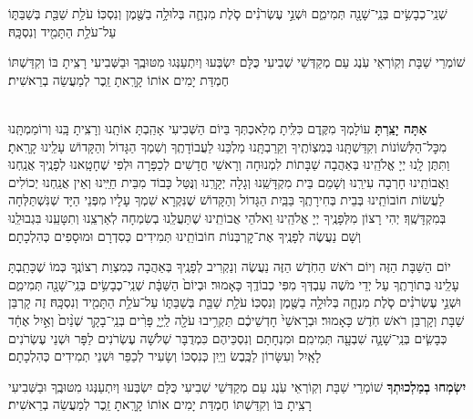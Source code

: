 \documentclass[twoside, openany, parskip=half, 11pt]{book}
\begin{document}
שְׁנֵֽי־כְבָשִׂ֥ים בְּנֵֽי־שָׁנָ֖ה תְּמִימִ֑ם וּשְׁנֵ֣י עֶשְׂרֹנִ֗ים סֹ֧לֶת מִנְחָ֛ה בְּלוּלָ֥ה בַשֶּׁ֖מֶן וְנִסְכּֽוֹ׃ עֹלַ֥ת שַׁבַּ֖ת בְּשַׁבַּתּ֑וֹ עַל־עֹלַ֥ת הַתָּמִ֖יד וְנִסְכָּֽהּ׃

שׁוֹמְרֵי שַׁבָּת וְקֽוֹרְאֵי עֹֽנֶג עַם מְקַדְּשֵׁי שְׁבִיעִי כֻּלָּם יִשְׂבְּעוּ וְיִתְעַנְּגוּ מִטּוּבֶֽךָ וּבַשְּׁבִיעִי רָצִֽיתָ בּוֹ וְקִדַּשְׁתּוֹ חֶמְדַּת יָמִים אוֹתוֹ קָרָֽאתָ זֵֽכֶר לְמַעֲשֵׂה בְרֵאשִׁית׃

\shabboskiddushhayom{} 

\begin{sometimes}

\label{shabbosroshchodesh}
\\
\textbf{אַתָּה יָצַֽרְתָּ}
עוֹלָמְךָ מִקֶּֽדֶם כִּלִּֽיתָ מְלַאכְתְּךָ בַּיוֹם הַשְּׁבִיעִי אָהַֽבְתָּ אוֹתָֽנוּ וְרָצִֽיתָ בָּֽנוּ וְרוֹמַמְתָּֽנוּ מִכׇּל־הַלְּשׁוֹנוֹת וְקִדַּשְׁתָּֽנוּ בְּמִצְוֹתֶֽיךָ וְקֵרַבְתָּֽנוּ מַלְכֵּנוּ לַעֲבוֹדָתֶֽךָ וְשִׁמְךָ הַגָּדוֹל וְהַקָּדוֹשׁ עָלֵֽינוּ קָרָֽאתָ׃ וַתִּתֶּן לָֽנוּ יְיָ אֱלֹהֵֽינוּ בְּאַהֲבָה שַׁבָּתוֹת לִמְנוּחָה וְרָאשֵׁי חֳדָשִׁים לְכַפָּרָה וּלְפִי שֶׁחָטָֽאנוּ לְפָנֶֽיךָ אֲנַֽחְנוּ וַאֲבוֹתֵֽינוּ חָרְבָה עִירֵֽנוּ וְשָׁמֵם בֵּית מִקְדָּשֵֽׁנוּ וְגָלָה יְקָרֵֽנוּ וְנֻּטַּל כָּבוֹד מִבֵּית חַיֵּֽינוּ וְאֵין אֲנַֽחְנוּ יְכוֹלִים לַעֲשׂוֹת חוֹבוֹתֵֽינוּ בְּבֵית בְּחִירָתֶֽךָ בַּבַּֽיִת הַגָּדוֹל וְהַקָּדוֹשׁ שֶׁנִּקְרָא שִׁמְךָ עָלָיו מִפְּנֵי הַיָּד שְׁנִּשְׁתַּלְּחָה בְּמִקְדָּשֶֽׁךָ׃ יְהִי רָצוֹן מִלְּפָנֶֽיךָ יְיָ אֱלֹהֵֽינוּ וֵאלֹהֵי אֲבוֹתֵֽינוּ שֶׁתַּעֲלֵֽנוּ בְשִׂמְחָה לְאַרְצֵֽנוּ וְתִטָּעֵֽנוּ בִּגְבוּלֵֽנוּ וְשָׁם נַעֲשֶׂה לְפָנֶֽיךָ אֶת־קׇרְבְּנוֹת חוֹבוֹתֵֽינוּ תְּמִידִים כְּסִדְרָם וּמוּסָפִים כְּהִלְכָתָם׃

יוֹם הַשַּׁבָּת הַזֶּה וְיוֹם רֹאשׁ הַחֹֽדֶשׁ הַזֶּה נַעֲשֶׂה וְנַקְרִיב לְפָנֶֽיךָ בְּאַהֲבָה כְּמִצְוַת רְצוֹנֶֽךָ כְּמוֹ שֶׁכָּתַֽבְתָּ עָלֵֽינוּ בְּתוֹרָתֶֽךָ עַל יְדֵי מֹשֶׁה עַבְדְּךָ מִפִּי כְבוֹדֶֽךָ כָּאָמוּר׃ וּבְיוֹם֙ הַשַּׁבָּ֔ת שְׁנֵֽי־כְבָשִׂ֥ים בְּנֵֽי־שָׁנָ֖ה תְּמִימִ֑ם וּשְׁנֵ֣י עֶשְׂרֹנִ֗ים סֹ֧לֶת מִנְחָ֛ה בְּלוּלָ֥ה בַשֶּׁ֖מֶן וְנִסְכּֽוֹ׃ עֹלַ֥ת שַׁבַּ֖ת בְּשַׁבַּתּ֑וֹ עַל־עֹלַ֥ת הַתָּמִ֖יד וְנִסְכָּֽהּ׃ זֶה קָרְבַּן שַׁבָּת וְקָרְבַּן רֹאשׁ חֹֽדֶשׁ כָּאָמוּר׃ וּבְרָאשֵׁי֙ חָדְשֵׁיכֶ֔ם תַּקְרִ֥יבוּ עֹלָ֖ה לַֽיְיָ֑ פָּרִ֨ים בְּנֵֽי־בָקָ֤ר שְׁנַ֨יִם֙ וְאַ֣יִל אֶחָ֔ד כְּבָשִׂ֧ים בְּנֵֽי־שָׁנָ֛ה שִׁבְעָ֖ה תְּמִימִֽם׃ וּמִנְחָתָם וְנִסְכֵּיהֶם כִּמְדֻבָּר שְׁלֹשָׁה עֶשְׂרֹנִים לַפָּר וּשְׁנֵי עֶשְׂרֹנִים לָאָֽיִל וְעִשָּׂרוֹן לַכֶּֽבֶשׂ וְיַֽיִן כְּנִסְכּוֹ וְשָׂעִיר לְכַפֵּר וּשְׁנֵי תְמִידִים כְּהִלְכָתָם׃

\textbf{יִשְׂמְחוּ בְמַלְכוּתְךָ}
שׁוֹמְרֵי שַׁבָּת וְקֽוֹרְאֵי עֹֽנֶג עַם מְקַדְּשֵׁי שְׁבִיעִי כֻּלָּם יִשְׂבְּעוּ וְיִתְעַנְּגוּ מִטּוּבֶֽךָ וּבַשְּׁבִיעִי רָצִֽיתָ בּוֹ וְקִדַּשְׁתּוֹ חֶמְדַּת יָמִים אוֹתוֹ קָרָֽאתָ זֵֽכֶר לְמַעֲשֵׂה בְרֵאשִׁית׃


\end{sometimes}
\end{document}
